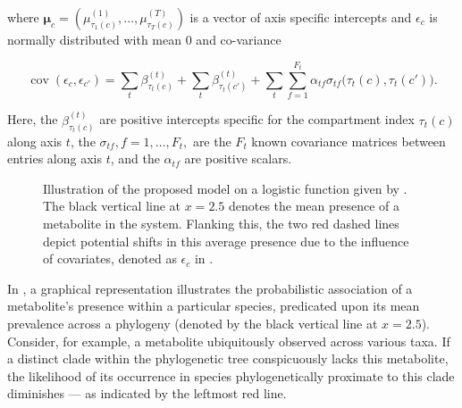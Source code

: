 \documentclass[
11pt, %
oneside, %
english, %
singlespacing, %
headsepline, %
chapterinoneline, %
]{MastersDoctoralThesis} %
\DeclareMathOperator{\cov}{cov}
\def\bmu{\boldsymbol{\mu}}
\begin{document}
where $\bmu_c=(\mu^{(1)}_{\tau_1(c)}, \ldots, \mu^{(T)}_{\tau_T(c)})$ is a vector of axis specific intercepts and $\epsilon_{c}$ is normally distributed with mean 0 and co-variance

\begin{equation}
	\cov(\epsilon_c, \epsilon_{c'}) = \sum_t \beta^{(t)}_{\tau_t(c)} + \sum_t \beta^{(t)}_{\tau_t(c')} + \sum_t \sum_{f=1}^{F_t} \alpha_{tf} \sigma_{tf}\Big(\tau_t(c), \tau_t(c')\Big).
\end{equation}

Here, the $\beta^{(t)}_{\tau_t(c)}$ are positive intercepts specific for the compartment index $\tau_t(c)$ along axis $t$, the $\sigma_{tf}, f=1, \ldots, F_t,$ are the $F_t$ known covariance matrices between entries along axis $t$, and the $\alpha_{tf}$ are positive scalars.

\begin{figure}[h]
	\centering
	\caption{Illustration of the proposed model on a logistic function given by . The black vertical line at $x=2.5$ denotes the mean presence of a metabolite in the system. Flanking this, the two red dashed lines depict potential shifts in this average presence due to the influence of covariates, denoted as $\epsilon_c$ in .}
	\label{fig: example sigmoid function}
\end{figure}

In , a graphical representation illustrates the probabilistic association of a metabolite's presence within a particular species, predicated upon its mean prevalence across a phylogeny (denoted by the black vertical line at $x=2.5$). Consider, for example, a metabolite ubiquitously observed across various taxa. If a distinct clade within the phylogenetic tree conspicuously lacks this metabolite, the likelihood of its occurrence in species phylogenetically proximate to this clade diminishes — as indicated by the leftmost red line.
	
\end{document}
